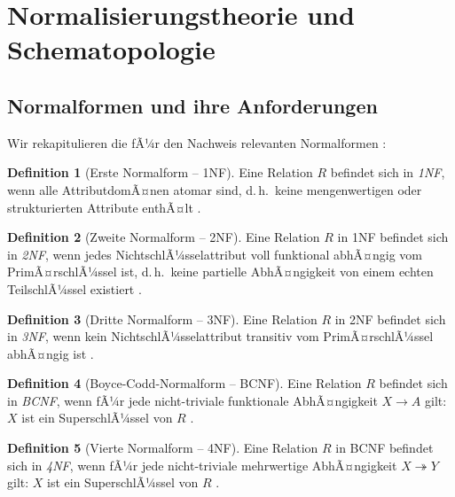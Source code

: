 ﻿\documentclass[a4paper,12pt]{report}
\theoremstyle{definition}
\newtheorem{definition}{Definition}[chapter]
\theoremstyle{remark}
\begin{document}
\section{Normalisierungstheorie und Schematopologie}
\label{sec:normalformen}

\subsection{Normalformen und ihre Anforderungen}

Wir rekapitulieren die fÃ¼r den Nachweis relevanten Normalformen \cite{Codd1974, Fagin1977}:

\begin{definition}[Erste Normalform -- 1NF]
Eine Relation $R$ befindet sich in \emph{1NF}, wenn alle AttributdomÃ¤nen
atomar sind, d.\,h.\ keine mengenwertigen oder strukturierten Attribute
enthÃ¤lt \cite{Codd1970}.
\end{definition}

\begin{definition}[Zweite Normalform -- 2NF]
Eine Relation $R$ in 1NF befindet sich in \emph{2NF}, wenn jedes
NichtschlÃ¼sselattribut voll funktional abhÃ¤ngig vom PrimÃ¤rschlÃ¼ssel ist,
d.\,h.\ keine partielle AbhÃ¤ngigkeit von einem echten TeilschlÃ¼ssel existiert
\cite{Codd1974}.
\end{definition}

\begin{definition}[Dritte Normalform -- 3NF]
Eine Relation $R$ in 2NF befindet sich in \emph{3NF}, wenn kein
NichtschlÃ¼sselattribut transitiv vom PrimÃ¤rschlÃ¼ssel abhÃ¤ngig ist
\cite{Codd1974}.
\end{definition}

\begin{definition}[Boyce-Codd-Normalform -- BCNF]
Eine Relation $R$ befindet sich in \emph{BCNF}, wenn fÃ¼r jede
nicht-triviale funktionale AbhÃ¤ngigkeit $X \to A$ gilt: $X$ ist ein
SuperschlÃ¼ssel von $R$ \cite{Boyce1974}.
\end{definition}

\begin{definition}[Vierte Normalform -- 4NF]
Eine Relation $R$ in BCNF befindet sich in \emph{4NF}, wenn fÃ¼r jede
nicht-triviale mehrwertige AbhÃ¤ngigkeit $X \twoheadrightarrow Y$ gilt:
$X$ ist ein SuperschlÃ¼ssel von $R$ \cite{Fagin1977}.
\end{definition}
\end{document}
